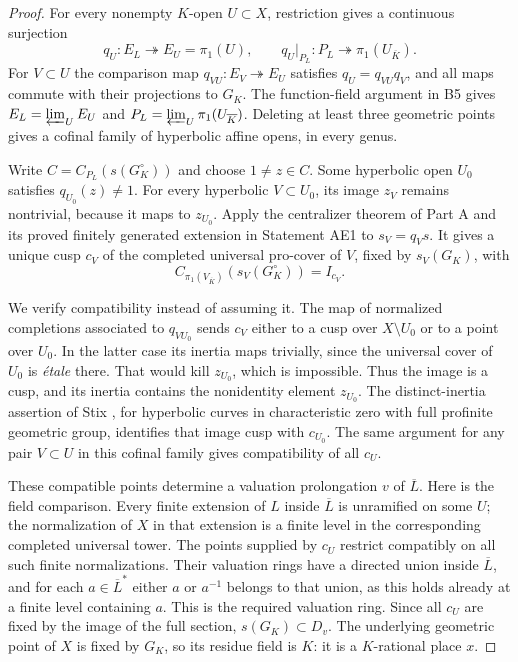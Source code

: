 \begin{proof}
For every nonempty $K$-open $U\subset X$, restriction gives a continuous
surjection
\[
 q_U:E_L\twoheadrightarrow E_U=\pi_1(U),
 \qquad q_U|_{P_L}:P_L\twoheadrightarrow\pi_1(U_{\overline K}).
\]
For $V\subset U$ the comparison map $q_{VU}:E_V\twoheadrightarrow E_U$
satisfies $q_U=q_{VU}q_V$, and all maps commute with their projections to
$G_K$. The function-field argument in B5 gives
$E_L=\varprojlim_U E_U$ and
$P_L=\varprojlim_U\pi_1(U_{\overline K})$.
Deleting at least three geometric points gives a cofinal family of
hyperbolic affine opens, in every genus.

Write $C=C_{P_L}(s(G_K^\circ))$ and choose $1\ne z\in C$.
Some hyperbolic open $U_0$ satisfies $q_{U_0}(z)\ne1$.
For every hyperbolic $V\subset U_0$, its image $z_V$ remains nontrivial,
because it maps to $z_{U_0}$. Apply the centralizer theorem of Part A and its proved finitely generated extension in Statement AE1 to
$s_V=q_Vs$. It gives a unique cusp $c_V$ of the completed universal
pro-cover of $V$, fixed by $s_V(G_K)$, with
\[
 C_{\pi_1(V_{\overline K})}(s_V(G_K^\circ))=I_{c_V}.
\]

We verify compatibility instead of assuming it. The map of normalized
completions associated to $q_{VU_0}$ sends $c_V$ either to a cusp over
$X\setminus U_0$ or to a point over $U_0$. In the latter case its inertia
maps trivially, since the universal cover of $U_0$ is \emph{\'etale}
there. That would kill $z_{U_0}$, which is impossible. Thus the image is
a cusp, and its inertia contains the nonidentity element $z_{U_0}$.
The distinct-inertia assertion of Stix
\cite[Proposition 11]{B_Stix2008}, for hyperbolic curves in characteristic
zero with full profinite geometric group, identifies that image cusp
with $c_{U_0}$. The same argument for any pair $V\subset U$ in this
cofinal family gives compatibility of all $c_U$.

These compatible points determine a valuation prolongation $v$ of
$\overline L$. Here is the field comparison. Every finite extension of
$L$ inside $\overline L$ is unramified on some $U$; the normalization of
$X$ in that extension is a finite level in the corresponding completed
universal tower. The points supplied by $c_U$ restrict compatibly on all
such finite normalizations. Their valuation rings have a directed union
inside $\overline L$, and for each $a\in\overline L^*$ either $a$ or
$a^{-1}$ belongs to that union, as this holds already at a finite level
containing $a$. This is the required valuation ring. Since all $c_U$ are
fixed by the image of the full section, $s(G_K)\subset D_v$. The
underlying geometric point of $X$ is fixed by $G_K$, so its residue field
is $K$: it is a $K$-rational place $x$.


\end{proof}
